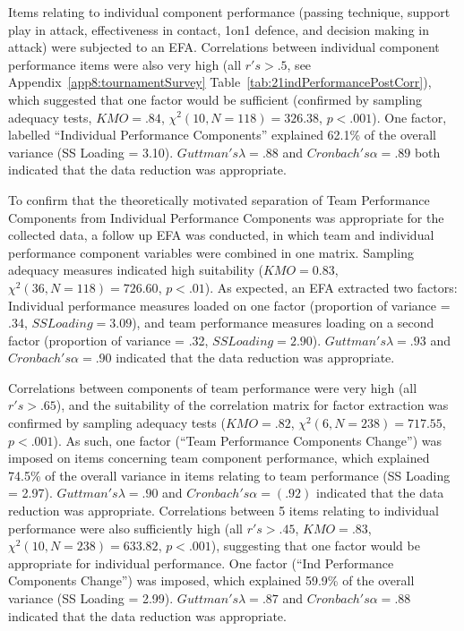 \begin{CJK}{UTF8}{gbsn}
Items relating to individual component performance (passing technique, support play in attack, effectiveness in contact, 1on1 defence, and decision making in attack)  were subjected to an EFA.  Correlations between individual component performance items were also very high (all $r's > .5$, see Appendix~\ref{app8:tournamentSurvey} Table~\ref{tab:21indPerformancePostCorr}), which suggested that one factor would be sufficient (confirmed by sampling adequacy tests, $KMO =  .84$, $\chi^2(10, N = 118) =  326.38$, $p < .001$).  One factor, labelled ``Individual Performance Components'' explained 62.1\% of the overall variance (SS Loading = 3.10).
$Guttman's \lambda =.88$ and $Cronbach's  \alpha = .89$ both indicated that the data reduction was appropriate.

To confirm that the theoretically motivated separation of Team Performance Components from Individual Performance Components was appropriate for the collected data, a follow up EFA was conducted, in which team and individual performance component variables were combined in one matrix.  Sampling adequacy measures indicated high suitability ($KMO = 0.83$, $\chi^2(36, N = 118) = 726.60$, $p < .01$).  As expected, an EFA extracted two factors: Individual performance measures loaded on one factor (proportion of variance = .34, $SS Loading = 3.09$), and team performance measures loading on a second factor (proportion of variance = .32, $SS Loading = 2.90$). $Guttman's \lambda =.93$ and $Cronbach's \alpha = .90$ indicated that the data reduction was appropriate.

Correlations between components of team performance were very high (all $r's > .65$), and the suitability of the correlation matrix for factor extraction was confirmed by sampling adequacy tests ($KMO = .82$, $\chi^2(6, N = 238) = 717.55$, $p < .001$).  As such, one factor (``Team Performance Components Change'') was imposed on items concerning team component performance, which explained 74.5\% of the overall variance in items relating to team performance (SS Loading = 2.97). $Guttman's \lambda =.90$ and $Cronbach's \alpha = (.92)$ indicated that the data reduction was appropriate.  Correlations between 5 items relating to individual performance were also sufficiently high (all $r's > .45$, $KMO = .83$, $\chi^2(10, N = 238) = 633.82$, $p < .001$), suggesting that one factor would be appropriate for individual performance.  One factor (``Ind Performance Components Change'') was imposed, which explained 59.9\% of the overall variance (SS Loading = 2.99).  $Guttman's \lambda =.87$ and $Cronbach's \alpha = .88$ indicated that the data reduction was appropriate.


\end{CJK}
